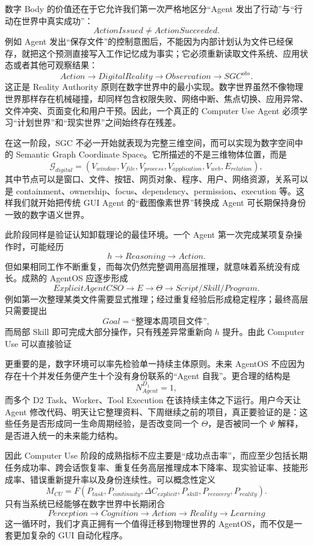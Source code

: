 数字 Body 的价值还在于它允许我们第一次严格地区分“Agent 发出了行动”与“行动在世界中真实成功”：
\[
ActionIssued
\neq
ActionSucceeded.
\]
例如 Agent 发出“保存文件”的控制意图后，不能因为内部计划认为文件已经保存，就把这个预测直接写入工作记忆成为事实；它必须重新读取文件系统、应用状态或者其他可观察结果：
\[
Action
\rightarrow
DigitalReality
\rightarrow
Observation
\rightarrow
SGC^{obs}.
\]
这正是 Reality Authority 原则在数字世界中的最小实现。数字世界虽然不像物理世界那样存在机械碰撞，却同样包含权限失败、网络中断、焦点切换、应用异常、文件冲突、页面变化和用户干预。因此，一个真正的 Computer Use Agent 必须学习“计划世界”和“现实世界”之间始终存在残差。

在这一阶段，SGC 不必一开始就表现为完整三维空间，而可以实现为数字空间中的 Semantic Graph Coordinate Space。它所描述的不是三维物体位置，而是
\[
\mathcal{G}_{digital}
=
(V_{window},
V_{file},
V_{process},
V_{application},
V_{web},
E_{relation}),
\]
其中节点可以是窗口、文件、按钮、网页对象、程序、用户、网络资源，关系可以是 containment、ownership、focus、dependency、permission、execution 等。这样我们就开始把传统 GUI Agent 的“截图像素世界”转换成 Agent 可长期保持身份一致的数字语义世界。

此阶段同样是验证认知卸载理论的最佳环境。一个 Agent 第一次完成某项复杂操作时，可能经历
\[
h
\rightarrow
Reasoning
\rightarrow
Action.
\]
但如果相同工作不断重复，而每次仍然完整调用高层推理，就意味着系统没有成长。成熟的 AgentOS 应逐步形成
\[
ExplicitAgentCSO
\rightarrow
E
\rightarrow
\Theta
\rightarrow
Script/Skill/Program.
\]
例如第一次整理某类文件需要显式推理；经过重复经验后形成稳定程序；最终高层只需要提出
\[
Goal=\text{“整理本周项目文件”},
\]
而局部 Skill 即可完成大部分操作，只有残差异常重新向 $h$ 提升。由此 Computer Use 可以直接验证
\begin{statementbox}
\centering
{}
\end{statementbox}

更重要的是，数字环境可以率先检验单一持续主体原则。未来 AgentOS 不应因为存在十个并发任务便产生十个没有身份联系的“Agent 自我”。更合理的结构是
\[
N_{Agent}^{D_1}=1,
\]
而多个 D2 Task、Worker、Tool Execution 在该持续主体之下运行。用户今天让 Agent 修改代码、明天让它整理资料、下周继续之前的项目，真正要验证的是：这些任务是否形成同一生命周期经验，是否改变同一个 $\Theta$，是否被同一个 $\Psi$ 解释，是否进入统一的未来能力结构。

因此 Computer Use 阶段的成熟指标不应主要是“成功点击率”，而应至少包括长期任务成功率、跨会话恢复率、重复任务高层推理成本下降率、现实验证率、技能形成率、错误重新提升率以及身份连续性。可以概念性定义
\[
M_{CU}
=
F(
P_{task},
P_{continuity},
\Delta C_{explicit},
P_{skill},
P_{recovery},
P_{reality}
).
\]
只有当系统已经能够在数字世界中长期闭合
\[
Perception
\rightarrow
Cognition
\rightarrow
Action
\rightarrow
Reality
\rightarrow
Learning
\]
这一循环时，我们才真正拥有一个值得迁移到物理世界的 AgentOS，而不仅是一套更加复杂的 GUI 自动化程序。

